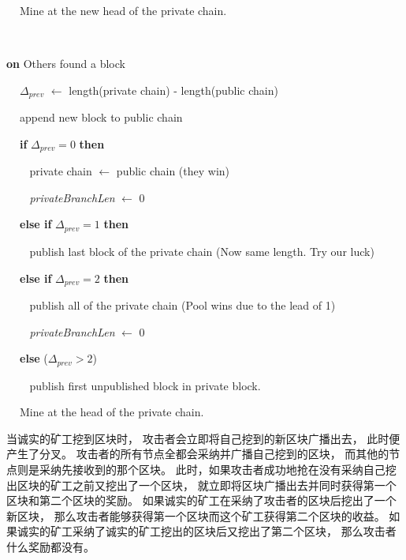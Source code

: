 \documentclass[a4paper, 11pt]{article}
\begin{document}
\begin{CJK*}{UTF8}{gbsn}
\begin{algorithm}
            $\ \ \ \ $ Mine at the new head of the private chain.
        
        $ $

        \textbf{on} Others found a block 

            $\ \ \ \ $ $\Delta_{\textit{prev}}$ $\leftarrow$ length(private chain) - length(public chain)
            
            $\ \ \ \ $ append new block to public chain 

            $\ \ \ \ $ \textbf{if} $\Delta_{\textit{prev}} = 0$ \textbf{then}

                $\ \ \ \ \ \ \ \ $ private chain $\leftarrow$ public chain \hfill (they win)

                $\ \ \ \ \ \ \ \ $ \textit{privateBranchLen} $\leftarrow$ 0
            
            $\ \ \ \ $ \textbf{else if} $\Delta_{\textit{prev}} = 1 $ \textbf{then}

                $\ \ \ \ \ \ \ \ $ publish last block of the private chain \hfill (Now same length. Try our luck)

            $\ \ \ \ $ \textbf{else if} $\Delta_{\textit{prev}} = 2 $ \textbf{then}

                $\ \ \ \ \ \ \ \ $ publish all of the private chain \hfill (Pool wins due to the lead of 1)

                $\ \ \ \ \ \ \ \ $ \textit{privateBranchLen} $\leftarrow$ 0
            
            $\ \ \ \ $ \textbf{else} \hfill ($\Delta_{\textit{prev}} > 2$)

                $\ \ \ \ \ \ \ \ $ publish first unpublished block in private block.
            
            $\ \ \ \ $ Mine at the head of the private chain.

    \end{algorithm}

    当诚实的矿工挖到区块时，
    攻击者会立即将自己挖到的新区块广播出去，
    此时便产生了分叉。
    攻击者的所有节点全都会采纳并广播自己挖到的区块，
    而其他的节点则是采纳先接收到的那个区块。
    此时，如果攻击者成功地抢在没有采纳自己挖出区块的矿工之前又挖出了一个区块，
    就立即将区块广播出去并同时获得第一个区块和第二个区块的奖励。
    如果诚实的矿工在采纳了攻击者的区块后挖出了一个新区块，
    那么攻击者能够获得第一个区块而这个矿工获得第二个区块的收益。
    如果诚实的矿工采纳了诚实的矿工挖出的区块后又挖出了第二个区块，
    那么攻击者什么奖励都没有。


\end{CJK*}
\end{document}
